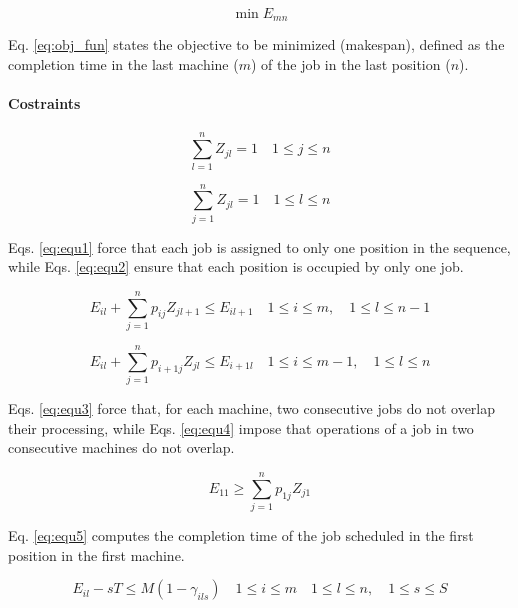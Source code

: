\begin{equation}
\min E_{mn}
\label{eq:obj_fun}
\end{equation}

Eq. \eqref{eq:obj_fun} states the objective to be minimized (makespan), defined as the completion time in the last machine ($m$) of the job in the last position ($n$).

\paragraph{Costraints}

\begin{equation}
\sum_{l=1}^{n} Z_{jl} = 1 \quad 1 \le j \le n
\label{eq:equ1}
\end{equation}

\begin{equation}
\sum_{j=1}^{n} Z_{jl} = 1 \quad 1 \le l \le n
\label{eq:equ2}
\end{equation}

Eqs. \eqref{eq:equ1} force that each job is assigned to only one position in the sequence, while Eqs. \eqref{eq:equ2} ensure that each position is occupied by only one job.

\begin{equation}
E_{il} + \sum_{j=1}^{n} p_{ij} Z_{jl+1} \le E_{il+1} \quad 1 \le i \le m, \quad 1 \le l \le n-1 
\label{eq:equ3}
\end{equation}

\begin{equation}
E_{il} + \sum_{j=1}^{n} p_{i+1j} Z_{jl} \le E_{i+1l} \quad 1 \le i \le m-1, \quad 1 \le l \le n 
\label{eq:equ4}
\end{equation}

Eqs. \eqref{eq:equ3} force that, for each machine, two consecutive jobs do not overlap their processing, while Eqs. \eqref{eq:equ4} impose that operations of a job in two consecutive machines do not overlap.

\begin{equation}
E_{11} \ge \sum_{j=1}^{n} p_{1j} Z_{j1}
\label{eq:equ5}
\end{equation}

Eq. \eqref{eq:equ5} computes the completion time of the job scheduled in the first position in the first machine.

\begin{equation}
E_{il} - sT \le M(1 - \gamma_{ils}) \quad 1 \le i \le m \quad 1 \le l \le n, \quad 1 \le s \le S
\label{eq:equ6}
\end{equation}


